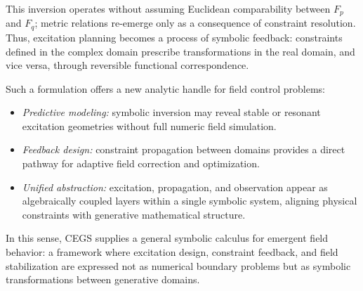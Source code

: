 \documentclass[11pt]{article}
\theoremstyle{plain}
\theoremstyle{definition}
\theoremstyle{remark}
\begin{document}
\vspace{4pt}
\noindent
This inversion operates without assuming Euclidean comparability between \(F_p\) and \(F_q\);
metric relations re-emerge only as a consequence of constraint resolution.
Thus, excitation planning becomes a process of symbolic feedback:
constraints defined in the complex domain prescribe transformations in the real domain,
and vice versa, through reversible functional correspondence.

\vspace{4pt}
\noindent
Such a formulation offers a new analytic handle for field control problems:
\begin{itemize}[leftmargin=*,itemsep=4pt]
  \item \emph{Predictive modeling:} symbolic inversion may reveal stable or resonant excitation geometries
        without full numeric field simulation.
  \item \emph{Feedback design:} constraint propagation between domains provides a direct pathway
        for adaptive field correction and optimization.
  \item \emph{Unified abstraction:} excitation, propagation, and observation appear as
        algebraically coupled layers within a single symbolic system,
        aligning physical constraints with generative mathematical structure.
\end{itemize}

\vspace{4pt}
\noindent
In this sense, CEGS supplies a general symbolic calculus for emergent field behavior:
a framework where excitation design, constraint feedback, and field stabilization
are expressed not as numerical boundary problems but as
symbolic transformations between generative domains.
\end{document}
